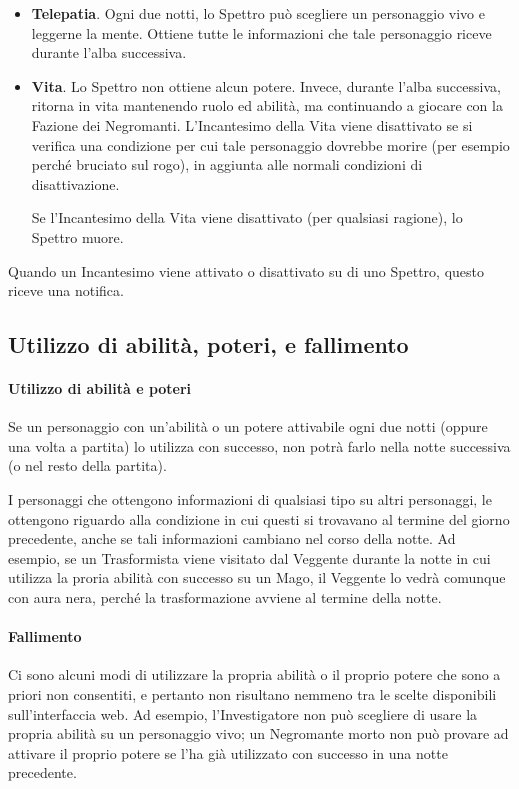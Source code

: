 \documentclass[a4paper,10pt]{article}
\begin{document}
\begin{itemize}
	\item {\bf Telepatia}. Ogni due notti, lo Spettro può scegliere un personaggio vivo e leggerne la mente. Ottiene tutte le informazioni che tale personaggio riceve durante l'alba successiva.
	
	\item {\bf Vita}. Lo Spettro non ottiene alcun potere. Invece, durante l'alba successiva, ritorna in vita mantenendo ruolo ed abilità, ma continuando a giocare con la Fazione dei Negromanti. L'Incantesimo della Vita viene disattivato se si verifica una condizione per cui tale personaggio dovrebbe morire (per esempio perché bruciato sul rogo), in aggiunta alle normali condizioni di disattivazione.
	
	Se l'Incantesimo della Vita viene disattivato (per qualsiasi ragione), lo Spettro muore.
 
\end{itemize}

Quando un Incantesimo viene attivato o disattivato su di uno Spettro, questo riceve una notifica.

\subsection{Utilizzo di abilità, poteri, e fallimento}
\label{fallimento}

\paragraph{Utilizzo di abilità e poteri} 

Se un personaggio con un'abilità o un potere attivabile ogni due notti (oppure una volta a partita) lo utilizza con successo, non potrà farlo nella notte successiva (o nel resto della partita).

I personaggi che ottengono informazioni di qualsiasi tipo su altri personaggi, le ottengono riguardo alla condizione in cui questi si trovavano al termine del giorno precedente, anche se tali informazioni cambiano nel corso della notte.
Ad esempio, se un Trasformista viene visitato dal Veggente durante la notte in cui utilizza la proria abilità con successo su un Mago, il Veggente lo vedrà comunque con aura nera, perché la trasformazione avviene al termine della notte.

\paragraph{Fallimento} Ci sono alcuni modi di utilizzare la propria abilità o il proprio potere che sono a priori non consentiti, e pertanto non risultano nemmeno tra le scelte disponibili sull'interfaccia web. Ad esempio, l'Investigatore non può scegliere di usare la propria abilità su un personaggio vivo; un Negromante morto non può provare ad attivare il proprio potere se l'ha già utilizzato con successo in una notte precedente.
\end{document}
